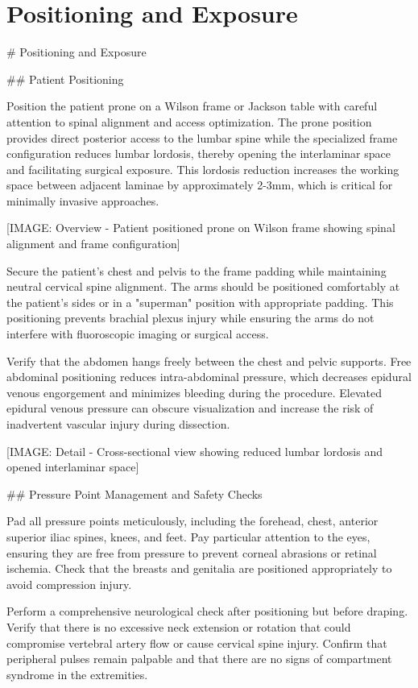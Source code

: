 \documentclass[12pt,a4paper]{article}
\begin{document}
\section{Positioning and Exposure}




\# Positioning and Exposure

\#\# Patient Positioning

Position the patient prone on a Wilson frame or Jackson table with careful attention to spinal alignment and access optimization. The prone position provides direct posterior access to the lumbar spine while the specialized frame configuration reduces lumbar lordosis, thereby opening the interlaminar space and facilitating surgical exposure. This lordosis reduction increases the working space between adjacent laminae by approximately 2-3mm, which is critical for minimally invasive approaches.

[IMAGE: Overview - Patient positioned prone on Wilson frame showing spinal alignment and frame configuration]

Secure the patient's chest and pelvis to the frame padding while maintaining neutral cervical spine alignment. The arms should be positioned comfortably at the patient's sides or in a "superman" position with appropriate padding. This positioning prevents brachial plexus injury while ensuring the arms do not interfere with fluoroscopic imaging or surgical access.

Verify that the abdomen hangs freely between the chest and pelvic supports. Free abdominal positioning reduces intra-abdominal pressure, which decreases epidural venous engorgement and minimizes bleeding during the procedure. Elevated epidural venous pressure can obscure visualization and increase the risk of inadvertent vascular injury during dissection.

[IMAGE: Detail - Cross-sectional view showing reduced lumbar lordosis and opened interlaminar space]

\#\# Pressure Point Management and Safety Checks

Pad all pressure points meticulously, including the forehead, chest, anterior superior iliac spines, knees, and feet. Pay particular attention to the eyes, ensuring they are free from pressure to prevent corneal abrasions or retinal ischemia. Check that the breasts and genitalia are positioned appropriately to avoid compression injury.

Perform a comprehensive neurological check after positioning but before draping. Verify that there is no excessive neck extension or rotation that could compromise vertebral artery flow or cause cervical spine injury. Confirm that peripheral pulses remain palpable and that there are no signs of compartment syndrome in the extremities.
\end{document}
